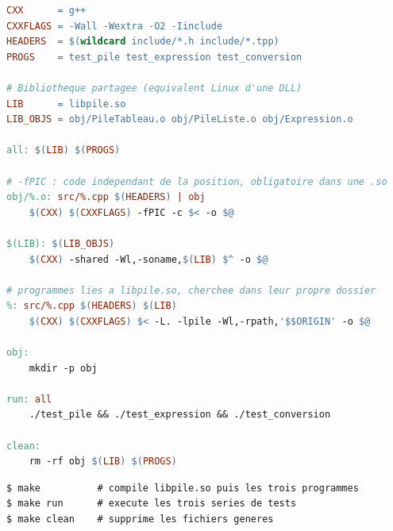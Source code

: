 \documentclass[11pt,a4paper]{article}
\newcommand{\code}[1]{\texttt{#1}}
\begin{document}
\begin{lstlisting}[language=make, style=sortie, caption={\code{Makefile}}]
CXX      = g++
CXXFLAGS = -Wall -Wextra -O2 -Iinclude
HEADERS  = $(wildcard include/*.h include/*.tpp)
PROGS    = test_pile test_expression test_conversion

# Bibliotheque partagee (equivalent Linux d'une DLL)
LIB      = libpile.so
LIB_OBJS = obj/PileTableau.o obj/PileListe.o obj/Expression.o

all: $(LIB) $(PROGS)

# -fPIC : code independant de la position, obligatoire dans une .so
obj/%.o: src/%.cpp $(HEADERS) | obj
	$(CXX) $(CXXFLAGS) -fPIC -c $< -o $@

$(LIB): $(LIB_OBJS)
	$(CXX) -shared -Wl,-soname,$(LIB) $^ -o $@

# programmes lies a libpile.so, cherchee dans leur propre dossier
%: src/%.cpp $(HEADERS) $(LIB)
	$(CXX) $(CXXFLAGS) $< -L. -lpile -Wl,-rpath,'$$ORIGIN' -o $@

obj:
	mkdir -p obj

run: all
	./test_pile && ./test_expression && ./test_conversion

clean:
	rm -rf obj $(LIB) $(PROGS)
\end{lstlisting}

\begin{lstlisting}[style=sortie]
$ make          # compile libpile.so puis les trois programmes
$ make run      # execute les trois series de tests
$ make clean    # supprime les fichiers generes
\end{lstlisting}
\end{document}
